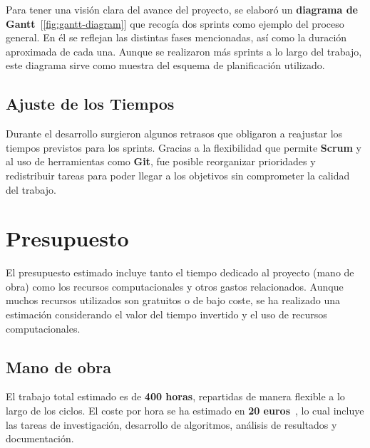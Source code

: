 Para tener una visión clara del avance del proyecto, se elaboró un \textbf{diagrama de Gantt}~[\ref{fig:gantt-diagram}]
que recogía dos sprints como ejemplo del proceso general.
En él se reflejan las distintas fases mencionadas, así como la duración aproximada de cada una.
Aunque se realizaron más sprints a lo largo del trabajo, este diagrama sirve como muestra del esquema de planificación
utilizado.

\subsection{Ajuste de los Tiempos}\label{subsec:ajuste-de-los-tiempos}
Durante el desarrollo surgieron algunos retrasos que obligaron a reajustar los tiempos previstos para los sprints.
Gracias a la flexibilidad que permite \textbf{Scrum} y al uso de herramientas como \textbf{Git}, fue posible
reorganizar prioridades y redistribuir tareas para poder llegar a los objetivos sin comprometer la calidad del trabajo.

\section{Presupuesto}\label{sec:presupuesto}
El presupuesto estimado incluye tanto el tiempo dedicado al proyecto (mano de obra) como los recursos computacionales y
otros gastos relacionados.
Aunque muchos recursos utilizados son gratuitos o de bajo coste, se ha realizado una estimación considerando el valor
del tiempo invertido y el uso de recursos computacionales.

\subsection{Mano de obra}\label{subsec:mano-de-obra}
El trabajo total estimado es de \textbf{400 horas}, repartidas de manera flexible a lo largo de los ciclos.
El coste por hora se ha estimado en \textbf{20 euros}~\cite{noauthor_salario_nodate}, lo cual incluye las tareas de
investigación, desarrollo de algoritmos, análisis de resultados y documentación.

